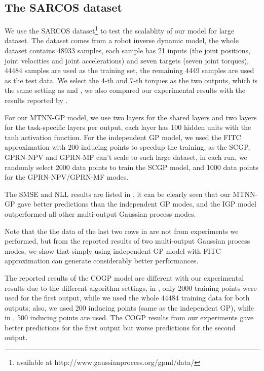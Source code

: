 \subsection{The SARCOS dataset}\label{sec:sarcos}

We use the SARCOS dataset\footnote{available at http://www.gaussianprocess.org/gpml/data/} to test the scalablity of our model for large dataset. The dataset comes from a robot inverse dynamic model, the whole dataset contains 48933 samples, each sample has 21 inputs (the joint positions, joint velocities and joint accelerations) and seven targets (seven joint torques), 44484 samples are used as the training set, the remaining 4449 samples are used as the test data. We select the 4-th and 7-th torques as the two outputs, which is the same setting as \cite{nguyen2014collaborative} and \cite{NIPS2015_5665}, we also compared our experimental results with the results reported by \cite{nguyen2014collaborative,NIPS2015_5665}.

For our MTNN-GP model, we use two layers for the shared layers and two layers for the task-specific layers per output, each layer has 100 hidden units with the tanh activation function. For the independent GP model, we used the FITC approximation with 200 inducing points to speedup the training, as the SCGP, GPRN-NPV and GPRN-MF can't scale to such large dataset, in each run, we randomly select 2000 data points to train the SCGP model, and 1000 data points for the GPRN-NPV/GPRN-MF modes.

The SMSE and NLL results are listed in , it can be clearly seen that our MTNN-GP gave better predictions than the independent GP modes, and the IGP model outperformed all other multi-output Gaussian process modes. 

Note that the the data of the last two rows in  are not from experiments we performed, but from the reported results of two multi-output Gaussian process modes\cite{nguyen2014collaborative, NIPS2015_5665}, we show that simply using independent GP model with FITC approximation can generate considerably better performances. 

The reported results of the COGP model are different with our experimental results due to the different algorithm settings, in \cite{nguyen2014collaborative}, only 2000 training points were used for the first output, while we used the whole 44484 training data for both outputs; also, we used 200 inducing points (same as the independent GP), while in \cite{nguyen2014collaborative}, 500 inducing points are used. The COGP results from our experiments gave better predictions for the first output but worse predictions for the second output.

